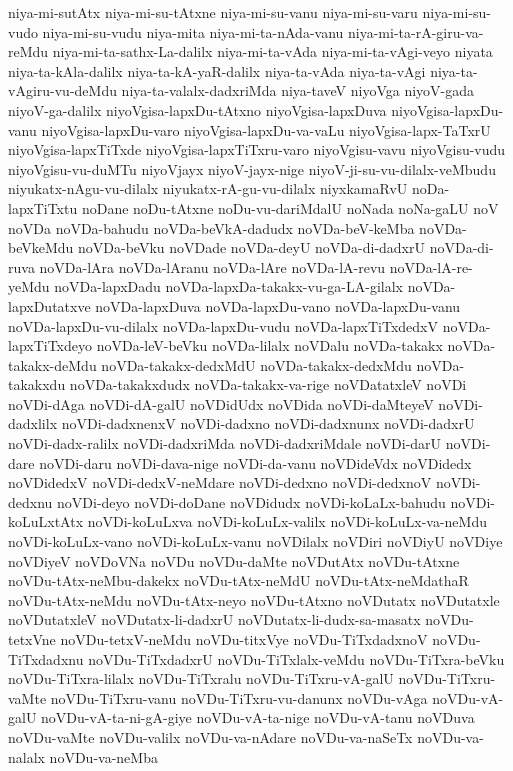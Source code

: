 {niya-mi-sutAtx
niya-mi-su-tAtxne
niya-mi-su-vanu
niya-mi-su-varu
niya-mi-su-vudo
niya-mi-su-vudu
niya-mita
niya-mi-ta-nAda-vanu
niya-mi-ta-rA-giru-va-reMdu
niya-mi-ta-sathx-La-dalilx
niya-mi-ta-vAda
niya-mi-ta-vAgi-veyo
niyata
niya-ta-kAla-dalilx
niya-ta-kA-yaR-dalilx
niya-ta-vAda
niya-ta-vAgi
niya-ta-vAgiru-vu-deMdu
niya-ta-valalx-dadxriMda
niya-taveV
niyoVga
niyoV-gada
niyoV-ga-dalilx
niyoVgisa-lapxDu-tAtxno
niyoVgisa-lapxDuva
niyoVgisa-lapxDu-vanu
niyoVgisa-lapxDu-varo
niyoVgisa-lapxDu-va-vaLu
niyoVgisa-lapx-TaTxrU
niyoVgisa-lapxTiTxde
niyoVgisa-lapxTiTxru-varo
niyoVgisu-vavu
niyoVgisu-vudu
niyoVgisu-vu-duMTu
niyoVjayx
niyoV-jayx-nige
niyoV-ji-su-vu-dilalx-veMbudu
niyukatx-nAgu-vu-dilalx
niyukatx-rA-gu-vu-dilalx
niyxkamaRvU
noDa-lapxTiTxtu
noDane
noDu-tAtxne
noDu-vu-dariMdalU
noNada
noNa-gaLU
noV
noVDa
noVDa-bahudu
noVDa-beVkA-dadudx
noVDa-beV-keMba
noVDa-beVkeMdu
noVDa-beVku
noVDade
noVDa-deyU
noVDa-di-dadxrU
noVDa-di-ruva
noVDa-lAra
noVDa-lAranu
noVDa-lAre
noVDa-lA-revu
noVDa-lA-re-yeMdu
noVDa-lapxDadu
noVDa-lapxDa-takakx-vu-ga-LA-gilalx
noVDa-lapxDutatxve
noVDa-lapxDuva
noVDa-lapxDu-vano
noVDa-lapxDu-vanu
noVDa-lapxDu-vu-dilalx
noVDa-lapxDu-vudu
noVDa-lapxTiTxdedxV
noVDa-lapxTiTxdeyo
noVDa-leV-beVku
noVDa-lilalx
noVDalu
noVDa-takakx
noVDa-takakx-deMdu
noVDa-takakx-dedxMdU
noVDa-takakx-dedxMdu
noVDa-takakxdu
noVDa-takakxdudx
noVDa-takakx-va-rige
noVDatatxleV
noVDi
noVDi-dAga
noVDi-dA-galU
noVDidUdx
noVDida
noVDi-daMteyeV
noVDi-dadxlilx
noVDi-dadxnenxV
noVDi-dadxno
noVDi-dadxnunx
noVDi-dadxrU
noVDi-dadx-ralilx
noVDi-dadxriMda
noVDi-dadxriMdale
noVDi-darU
noVDi-dare
noVDi-daru
noVDi-dava-nige
noVDi-da-vanu
noVDideVdx
noVDidedx
noVDidedxV
noVDi-dedxV-neMdare
noVDi-dedxno
noVDi-dedxnoV
noVDi-dedxnu
noVDi-deyo
noVDi-doDane
noVDidudx
noVDi-koLaLx-bahudu
noVDi-koLuLxtAtx
noVDi-koLuLxva
noVDi-koLuLx-valilx
noVDi-koLuLx-va-neMdu
noVDi-koLuLx-vano
noVDi-koLuLx-vanu
noVDilalx
noVDiri
noVDiyU
noVDiye
noVDiyeV
noVDoVNa
noVDu
noVDu-daMte
noVDutAtx
noVDu-tAtxne
noVDu-tAtx-neMbu-dakekx
noVDu-tAtx-neMdU
noVDu-tAtx-neMdathaR
noVDu-tAtx-neMdu
noVDu-tAtx-neyo
noVDu-tAtxno
noVDutatx
noVDutatxle
noVDutatxleV
noVDutatx-li-dadxrU
noVDutatx-li-dudx-sa-masatx
noVDu-tetxVne
noVDu-tetxV-neMdu
noVDu-titxVye
noVDu-TiTxdadxnoV
noVDu-TiTxdadxnu
noVDu-TiTxdadxrU
noVDu-TiTxlalx-veMdu
noVDu-TiTxra-beVku
noVDu-TiTxra-lilalx
noVDu-TiTxralu
noVDu-TiTxru-vA-galU
noVDu-TiTxru-vaMte
noVDu-TiTxru-vanu
noVDu-TiTxru-vu-danunx
noVDu-vAga
noVDu-vA-galU
noVDu-vA-ta-ni-gA-giye
noVDu-vA-ta-nige
noVDu-vA-tanu
noVDuva
noVDu-vaMte
noVDu-valilx
noVDu-va-nAdare
noVDu-va-naSeTx
noVDu-va-nalalx
noVDu-va-neMba
}
